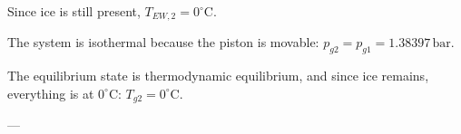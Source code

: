 Since ice is still present, \( T_{EW,2} = 0^\circ \text{C} \).  

The system is isothermal because the piston is movable:  
\( p_{g2} = p_{g1} = 1.38397 \, \text{bar} \).  

The equilibrium state is thermodynamic equilibrium, and since ice remains, everything is at \( 0^\circ \text{C} \):  
\( T_{g2} = 0^\circ \text{C} \).  

---